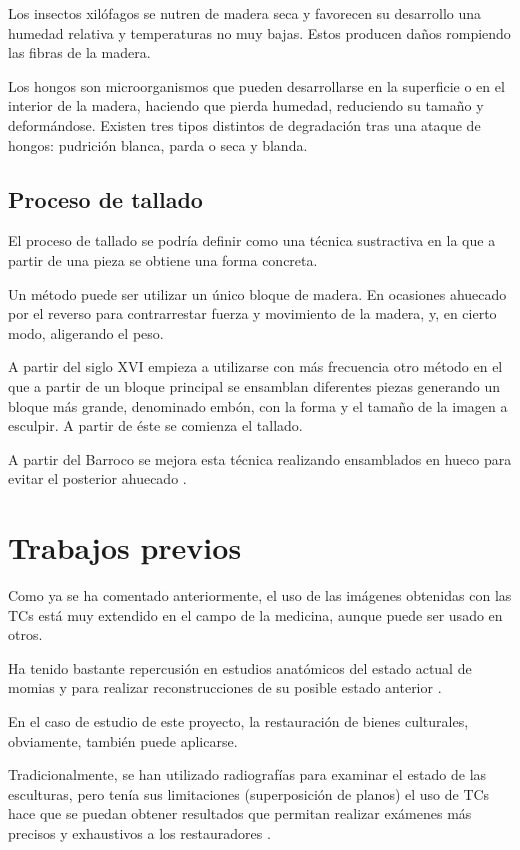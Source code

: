 Los insectos xilófagos se nutren de madera seca y favorecen su desarrollo una humedad relativa y temperaturas no muy bajas. Estos producen daños rompiendo las fibras de la madera.

Los hongos son microorganismos que pueden desarrollarse en la superficie o en el interior de la madera, haciendo que pierda humedad, reduciendo su tamaño y deformándose. Existen tres tipos distintos de degradación tras una ataque de hongos: pudrición blanca, parda o seca y blanda.

\subsection{Proceso de tallado}

El proceso de tallado se podría definir como una técnica sustractiva en la que a partir de una pieza se obtiene una forma concreta.

Un método puede ser utilizar un único bloque de madera. En ocasiones ahuecado por el reverso para contrarrestar fuerza y movimiento de la madera, y, en cierto modo, aligerando el peso.

A partir del siglo XVI empieza a utilizarse con más frecuencia otro método en el que a partir de un bloque principal se ensamblan diferentes piezas generando un bloque más grande, denominado embón, con la forma y el tamaño de la imagen a esculpir. A partir de éste se comienza el tallado.

A partir del Barroco se mejora esta técnica realizando ensamblados en hueco para evitar el posterior ahuecado \cite{tc_esculturas}.



\section{Trabajos previos}

Como ya se ha comentado anteriormente, el uso de las imágenes obtenidas con las TCs está muy extendido en el campo de la medicina, aunque puede ser usado en otros. 

Ha tenido bastante repercusión en estudios anatómicos del estado actual de momias \cite{mummies} y para realizar reconstrucciones de su posible estado anterior \cite{mummies_reconstruction}.

En el caso de estudio de este proyecto, la restauración de bienes culturales, obviamente, también puede aplicarse.

Tradicionalmente, se han utilizado radiografías para examinar el estado de las esculturas, pero tenía sus limitaciones (superposición de planos) el uso de TCs hace que se puedan obtener resultados que permitan realizar exámenes más precisos y exhaustivos a los restauradores \cite{tc_esculturas}.

